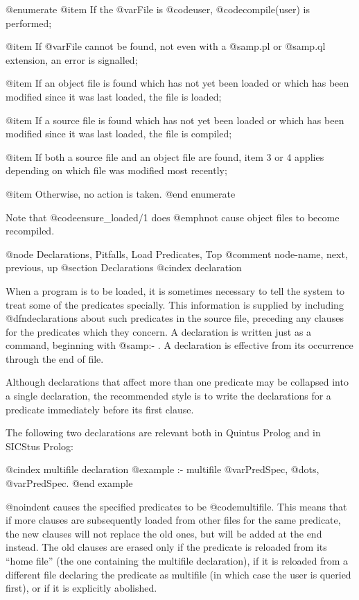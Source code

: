 @enumerate
@item
If the @var{File} is @code{user}, @code{compile(user)} is
performed;

@item
If @var{File} cannot be found, not even with a @samp{.pl} or
@samp{.ql} extension, an error is signalled;

@item
If an object file is found which has not yet been loaded or which
has been modified since it was last loaded, the file is loaded;

@item
If a source file is found which has not yet been loaded or which
has been modified since it was last loaded, the file is compiled;

@item
If both a source file and an object file are found, item 3 or 4
applies depending on which file was modified most recently;

@item
Otherwise, no action is taken.
@end enumerate

Note that @code{ensure_loaded/1} does @emph{not} cause object files to
become recompiled.

@node Declarations, Pitfalls, Load Predicates, Top
@comment  node-name,  next,  previous,  up
@section Declarations
@cindex declaration

When a program is to be loaded, it is sometimes necessary to tell the
system to treat some of the predicates specially.  This information is
supplied by including @dfn{declarations} about such predicates in the
source file, preceding any clauses for the predicates which they
concern.  A declaration is written just as a command, beginning with
@samp{:- }.  A declaration is effective from its occurrence through the
end of file.

Although declarations that affect more than one predicate may be
collapsed into a single declaration, the recommended style is to write
the declarations for a predicate immediately before its first clause.

The following two declarations are relevant both in Quintus Prolog and in
SICStus Prolog:

@cindex multifile declaration
@example
:- multifile @var{PredSpec}, @dots{}, @var{PredSpec}.
@end example

@noindent
causes the specified predicates to be @code{multifile}.  This means that
if more clauses are subsequently loaded from other files for the same
predicate, the new clauses will not replace the old ones, but will be
added at the end instead.  The old clauses are erased only if the
predicate is reloaded from its ``home file'' (the one containing the
multifile declaration), if it is reloaded from a different file
declaring the predicate as multifile (in which case the user is queried
first), or if it is explicitly abolished.

